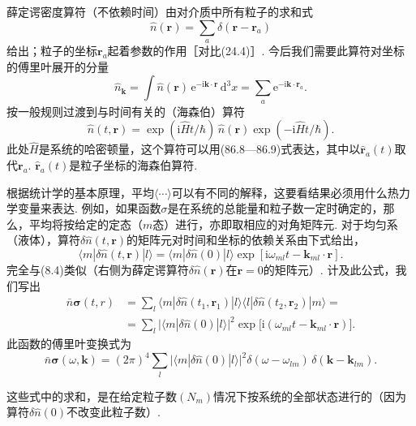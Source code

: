 薛定谔密度算符（不依赖时间）由对介质中所有粒子的求和式
\begin{equation}
\hat{n}(\bm{r})=\sum_{a}\delta(\bm{r}-\bm{r}_{a})
\end{equation}
给出；粒子的坐标$\bm{r}_{a}$起着参数的作用［对比(24.4)］. 今后我们需要此算符对坐标的傅里叶展开的分量
\begin{equation}
\hat{n}_{\bm{k}}=\int\hat{n}(\bm{r})\,\mathrm{e}^{-\mathrm{i}\bm{k}\cdot\bm{r}}\,\mathrm{d}^{3}x=\sum_{a}\mathrm{e}^{-\mathrm{i}\bm{k}\cdot\bm{r}_{a}}.
\end{equation}
按一般规则过渡到与时间有关的（海森伯）算符
\begin{equation}
\hat{n}(t,\bm{r})=\exp(\mathrm{i}\hat{H}t/\hbar)\,\hat{n}(\bm{r})\exp(-\mathrm{i}\hat{H}t/\hbar).
\end{equation}
此处$\hat{H}$是系统的哈密顿量，这个算符可以用(86.8—86.9)式表达，其中以$\hat{\bm{r}}_{a}(t)$取代$\bm{r}_{a}$. $\hat{\bm{r}}_{a}(t)$是粒子坐标的海森伯算符.

根据统计学的基本原理，平均$\langle\cdots\rangle$可以有不同的解释，这要看结果必须用什么热力学变量来表达. 例如，如果函数$\sigma$是在系统的总能量和粒子数一定时确定的，那么，平均将按给定的定态（$m$态）进行，亦即取相应的对角矩阵元. 对于均匀系（液体），算符$\delta\hat{n}(t,\bm{r})$的矩阵元对时间和坐标的依赖关系由下式给出，
\begin{equation}
\langle m|\delta\hat{n}(t,\bm{r})|l\rangle=\langle m|\delta\hat{n}(0)|l\rangle\exp[\mathrm{i}\omega_{ml}t-\bm{k}_{ml}\cdot\bm{r}].
\end{equation}
完全与(8.4)类似（右侧为薛定谔算符$\delta\hat{n}(\bm{r})$在$\bm{r}=0$的矩阵元）. 计及此公式，我们写出
\begin{equation*}
\begin{aligned}
\bar{n}\bm{\sigma}(t,r)&=\sum_{l}\langle m|\delta\hat{n}(t_{1},\bm{r}_{1})|l\rangle\langle l|\delta\hat{n}(t_{2},\bm{r}_{2})|m\rangle=\\
&=\sum_{l}\bigl|\langle m|\delta\hat{n}(0)|l\rangle\bigr|^{2}\exp\bigl[\mathrm{i}(\omega_{ml}t-\bm{k}_{ml}\cdot\bm{r})\bigr].
\end{aligned}
\end{equation*}
此函数的傅里叶变换式为
\begin{equation}
\bar{n}\bm{\sigma}(\omega,\bm{k})=(2\pi)^{4}\sum_{l}\bigl|\langle m|\delta\hat{n}(0)|l\rangle\bigr|^{2}\delta(\omega-\omega_{lm})\,\delta(\bm{k}-\bm{k}_{lm}).
\end{equation}

这些式中的求和，是在给定粒子数$(N_{m})$情况下按系统的全部状态进行的（因为算符$\delta\hat{n}(0)$不改变此粒子数）.

